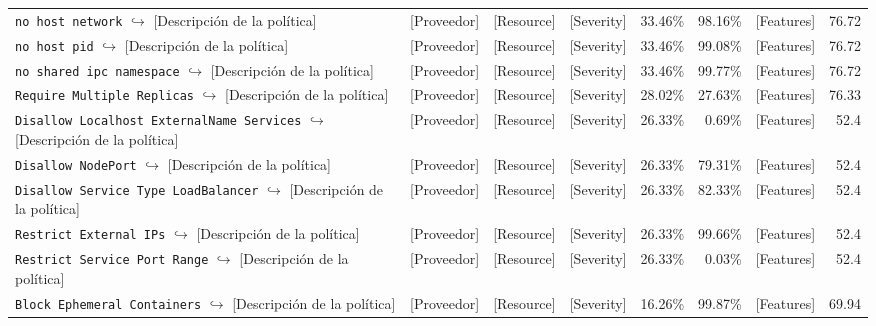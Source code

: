 \begin{table}[ht]
\begin{tabular}{lcccrrrr}
\makecell[l]{\texttt{no host network} \\ $\hookrightarrow$ [Descripción de la política]} & [Proveedor] & [Resource] & [Severity] & 33.46\% & 98.16\% & [Features] & 76.72 \\
\makecell[l]{\texttt{no host pid} \\ $\hookrightarrow$ [Descripción de la política]} & [Proveedor] & [Resource] & [Severity] & 33.46\% & 99.08\% & [Features] & 76.72 \\
\makecell[l]{\texttt{no shared ipc namespace} \\ $\hookrightarrow$ [Descripción de la política]} & [Proveedor] & [Resource] & [Severity] & 33.46\% & 99.77\% & [Features] & 76.72 \\
\makecell[l]{\texttt{Require Multiple Replicas} \\ $\hookrightarrow$ [Descripción de la política]} & [Proveedor] & [Resource] & [Severity] & 28.02\% & 27.63\% & [Features] & 76.33 \\
\makecell[l]{\texttt{Disallow Localhost ExternalName Services} \\ $\hookrightarrow$ [Descripción de la política]} & [Proveedor] & [Resource] & [Severity] & 26.33\% & 0.69\% & [Features] & 52.4 \\
\makecell[l]{\texttt{Disallow NodePort} \\ $\hookrightarrow$ [Descripción de la política]} & [Proveedor] & [Resource] & [Severity] & 26.33\% & 79.31\% & [Features] & 52.4 \\
\makecell[l]{\texttt{Disallow Service Type LoadBalancer} \\ $\hookrightarrow$ [Descripción de la política]} & [Proveedor] & [Resource] & [Severity] & 26.33\% & 82.33\% & [Features] & 52.4 \\
\makecell[l]{\texttt{Restrict External IPs} \\ $\hookrightarrow$ [Descripción de la política]} & [Proveedor] & [Resource] & [Severity] & 26.33\% & 99.66\% & [Features] & 52.4 \\
\makecell[l]{\texttt{Restrict Service Port Range} \\ $\hookrightarrow$ [Descripción de la política]} & [Proveedor] & [Resource] & [Severity] & 26.33\% & 0.03\% & [Features] & 52.4 \\
\makecell[l]{\texttt{Block Ephemeral Containers} \\ $\hookrightarrow$ [Descripción de la política]} & [Proveedor] & [Resource] & [Severity] & 16.26\% & 99.87\% & [Features] & 69.94 \\

\end{tabular}
\end{table}
